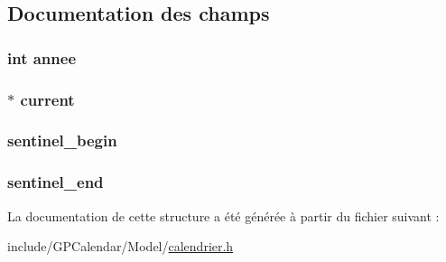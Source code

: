 \subsection{Documentation des champs}
\hypertarget{struct_list_mois_acfe2ff64f5396827db36f1575c5e99d8}{
\subsubsection[{annee}]{\setlength{\rightskip}{0pt plus 5cm}int annee}}\label{struct_list_mois_acfe2ff64f5396827db36f1575c5e99d8}
\hypertarget{struct_list_mois_a5b776be43208a3cfeec9d21bf0fe0624}{
\subsubsection[{current}]{$\ast$ current}}\label{struct_list_mois_a5b776be43208a3cfeec9d21bf0fe0624}
\hypertarget{struct_list_mois_a348d32e033fef5b956bbd0470f22a50c}{
\subsubsection[{sentinel\-\_\-begin}]{ sentinel\-\_\-begin}}\label{struct_list_mois_a348d32e033fef5b956bbd0470f22a50c}
\hypertarget{struct_list_mois_abcefbcec0ea15d4123448b26256468fe}{
\subsubsection[{sentinel\-\_\-end}]{ sentinel\-\_\-end}}\label{struct_list_mois_abcefbcec0ea15d4123448b26256468fe}


La documentation de cette structure a été générée à partir du fichier suivant \-:\begin{DoxyCompactItemize}
\item 
include/\-G\-P\-Calendar/\-Model/\hyperlink{calendrier_8h}{calendrier.\-h}\end{DoxyCompactItemize}
